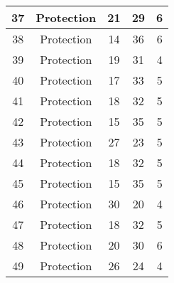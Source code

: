 \documentclass[results.tex]{subfiles}
\begin{document}
\begin{center}
\begin{tabular}{| c || c | c | c | c |}
            \hline
            37                      & Protection                   & 21                     & 29                      & 6                    \\
            \hline
            38                      & Protection                   & 14                     & 36                      & 6                    \\
            \hline
            39                      & Protection                   & 19                     & 31                      & 4                    \\
            \hline
            40                      & Protection                   & 17                     & 33                      & 5                    \\
            \hline
            41                      & Protection                   & 18                     & 32                      & 5                    \\
            \hline
            42                      & Protection                   & 15                     & 35                      & 5                    \\
            \hline
            43                      & Protection                   & 27                     & 23                      & 5                    \\
            \hline
            44                      & Protection                   & 18                     & 32                      & 5                    \\
            \hline
            45                      & Protection                   & 15                     & 35                      & 5                    \\
            \hline
            46                      & Protection                   & 30                     & 20                      & 4                    \\
            \hline
            47                      & Protection                   & 18                     & 32                      & 5                    \\
            \hline
            48                      & Protection                   & 20                     & 30                      & 6                    \\
            \hline
            49                      & Protection                   & 26                     & 24                      & 4                    \\
            \hline
        \end{tabular}
    \end{center}
\end{document}
